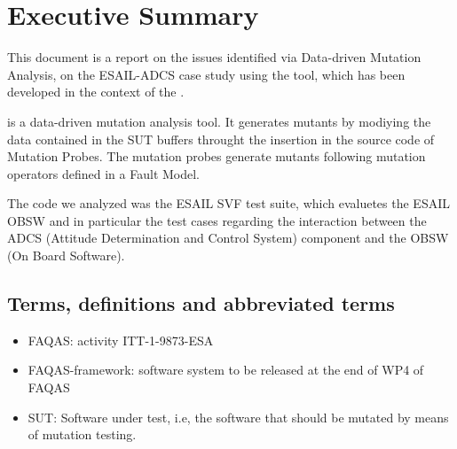 
\chapter{Executive Summary}

This document is a report on the issues identified via Data-driven Mutation Analysis, on the ESAIL-ADCS case study using the \DAMA tool, which has been developed in the context of the \FAQAS.

\DAMA is a data-driven mutation analysis tool. It generates mutants by modiying the data contained in the SUT buffers throught the insertion in the source code of Mutation Probes. The mutation probes generate mutants following mutation operators defined in a Fault Model.

The code we analyzed was the ESAIL SVF test suite, which evaluetes the ESAIL OBSW and in particular the test cases regarding the interaction between the ADCS (Attitude Determination and Control System) component and the OBSW (On Board Software).


\section{Terms, definitions and abbreviated terms}

\begin{itemize}
\item{FAQAS}: activity ITT-1-9873-ESA
\item{FAQAS-framework}: software system to be released at the end of WP4 of FAQAS
\item{SUT}: Software under test, i.e, the software that should be mutated by means of mutation testing.
\end{itemize}

\clearpage
